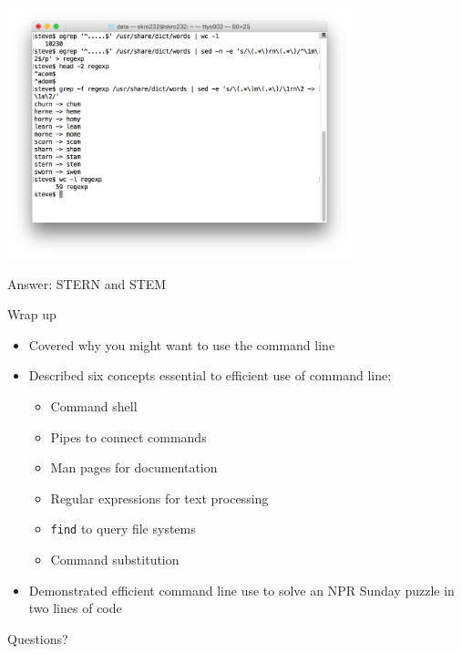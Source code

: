\documentclass[t]{beamer}
\begin{document}
\begin{frame}{}
  \includegraphics[width=10cm,scale=0.4]{images/puzzle.png}

  Answer: STERN and STEM
  \note{}
\end{frame}

\begin{frame}{Wrap up}
  \begin{itemize}
  \item Covered why you might want to use the command line
    \pause
  \item Described six concepts essential to efficient use of command
    line:
    \begin{itemize}
    \item Command shell
    \pause
    \item Pipes to connect commands
    \pause
    \item Man pages for documentation
    \pause
    \item Regular expressions for text processing
    \pause
    \item \texttt{find} to query file systems
    \pause
    \item Command substitution
    \end{itemize}
    \pause
  \item Demonstrated efficient command line use to solve an NPR Sunday puzzle
    in two lines of code
  \end{itemize}
  \note{}
\end{frame}

\begin{frame}{Questions?}
  \note{}
\end{frame}
\end{document}
